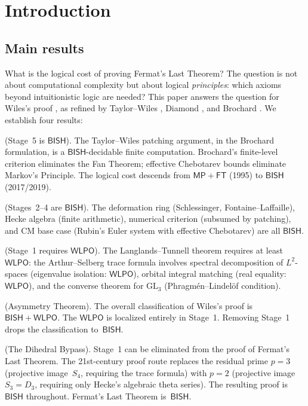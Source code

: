 \documentclass[11pt]{article}
\theoremstyle{plain}
\theoremstyle{definition}
\theoremstyle{remark}
\newcommand{\GL}{\mathrm{GL}}
\newcommand{\BISH}{\mathsf{BISH}}
\newcommand{\WLPO}{\mathsf{WLPO}}
\newcommand{\MP}{\mathsf{MP}}
\newcommand{\FT}{\mathsf{FT}}
\begin{document}
\tableofcontents

\section{Introduction}\label{sec:intro}

\subsection{Main results}

What is the logical cost of proving Fermat's Last Theorem?
The question is not about computational complexity but about logical
\emph{principles}: which axioms beyond intuitionistic logic are
needed?  This paper answers the question for Wiles's proof
\cite{Wiles1995}, as refined by Taylor--Wiles \cite{TaylorWiles1995},
Diamond \cite{Diamond1997}, and Brochard \cite{Brochard2017}.
We establish four results:

\begin{description}[leftmargin=2em]
\item[Theorem A] (Stage~5 is $\BISH$).
The Taylor--Wiles patching argument, in the Brochard formulation, is
a $\BISH$-decidable finite computation.  Brochard's finite-level
criterion \cite{Brochard2017} eliminates the Fan Theorem;
effective Chebotarev bounds \cite{LMO1979, AhnKwon2019} eliminate
Markov's Principle.  The logical cost descends from
$\MP + \FT$ (1995) to $\BISH$ (2017/2019).

\item[Theorem B] (Stages~2--4 are $\BISH$).
The deformation ring (Schlessinger, Fontaine--Laffaille),
Hecke algebra (finite arithmetic), numerical criterion (subsumed
by patching), and CM base case (Rubin's Euler system with
effective Chebotarev) are all $\BISH$.

\item[Theorem C] (Stage~1 requires $\WLPO$).
The Langlands--Tunnell theorem requires
at least~$\WLPO$: the Arthur--Selberg trace formula involves
spectral decomposition of $L^2$-spaces (eigenvalue isolation:
$\WLPO$), orbital integral matching (real equality: $\WLPO$),
and the converse theorem for $\GL_3$ (Phragm\'en--Lindel\"of
condition).

\item[Theorem D] (Asymmetry Theorem).
The overall classification of Wiles's proof is $\BISH + \WLPO$.
The $\WLPO$ is localized entirely in Stage~1.  Removing Stage~1
drops the classification to~$\BISH$.

\item[Theorem E] (The Dihedral Bypass).
Stage~1 can be eliminated from the proof of Fermat's Last Theorem.
The 21st-century proof route replaces the residual prime $p = 3$
(projective image~$S_4$, requiring the trace formula) with $p = 2$
(projective image~$S_3 = D_3$, requiring only Hecke's algebraic
theta series).  The resulting proof is $\BISH$ throughout.
Fermat's Last Theorem is~$\BISH$.
\end{description}
\end{document}
